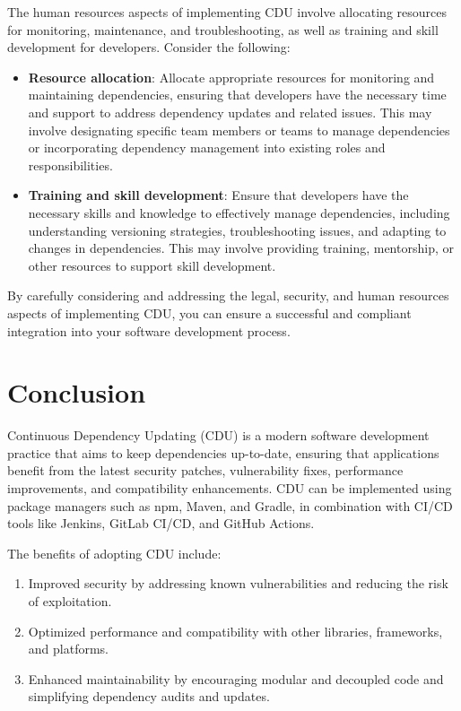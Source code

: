 \documentclass[10pt]{article}
\begin{document}
The human resources aspects of implementing CDU involve allocating resources for monitoring, maintenance, and troubleshooting, as well as training and skill development for developers. Consider the following:

\begin{itemize}

  \item \textbf{Resource allocation}: Allocate appropriate resources for monitoring and maintaining dependencies, ensuring that developers have the necessary time and support to address dependency updates and related issues. This may involve designating specific team members or teams to manage dependencies or incorporating dependency management into existing roles and responsibilities.

  \item \textbf{Training and skill development}: Ensure that developers have the necessary skills and knowledge to effectively manage dependencies, including understanding versioning strategies, troubleshooting issues, and adapting to changes in dependencies. This may involve providing training, mentorship, or other resources to support skill development.

\end{itemize}

By carefully considering and addressing the legal, security, and human resources aspects of implementing CDU, you can ensure a successful and compliant integration into your software development process.

\section*{Conclusion}

Continuous Dependency Updating (CDU) is a modern software development practice that aims to keep dependencies up-to-date, ensuring that applications benefit from the latest security patches, vulnerability fixes, performance improvements, and compatibility enhancements. CDU can be implemented using package managers such as npm, Maven, and Gradle, in combination with CI/CD tools like Jenkins, GitLab CI/CD, and GitHub Actions.

The benefits of adopting CDU include:

\begin{enumerate}

  \item Improved security by addressing known vulnerabilities and reducing the risk of exploitation.

  \item Optimized performance and compatibility with other libraries, frameworks, and platforms.

  \item Enhanced maintainability by encouraging modular and decoupled code and simplifying dependency audits and updates.

\end{enumerate}
\end{document}
